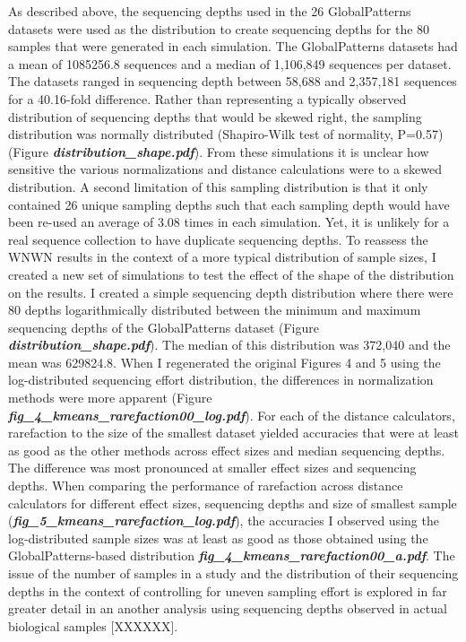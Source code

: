 \documentclass[
]{article}
\begin{document}
As described above, the sequencing depths used in the 26 GlobalPatterns
datasets were used as the distribution to create sequencing depths for
the 80 samples that were generated in each simulation. The
GlobalPatterns datasets had a mean of 1085256.8 sequences and a median
of 1,106,849 sequences per dataset. The datasets ranged in sequencing
depth between 58,688 and 2,357,181 sequences for a 40.16-fold
difference. Rather than representing a typically observed distribution
of sequencing depths that would be skewed right, the sampling
distribution was normally distributed (Shapiro-Wilk test of normality,
P=0.57) (Figure \textbf{\emph{distribution\_shape.pdf}}). From these
simulations it is unclear how sensitive the various normalizations and
distance calculations were to a skewed distribution. A second limitation
of this sampling distribution is that it only contained 26 unique
sampling depths such that each sampling depth would have been re-used an
average of 3.08 times in each simulation. Yet, it is unlikely for a real
sequence collection to have duplicate sequencing depths. To reassess the
WNWN results in the context of a more typical distribution of sample
sizes, I created a new set of simulations to test the effect of the
shape of the distribution on the results. I created a simple sequencing
depth distribution where there were 80 depths logarithmically
distributed between the minimum and maximum sequencing depths of the
GlobalPatterns dataset (Figure \textbf{\emph{distribution\_shape.pdf}}).
The median of this distribution was 372,040 and the mean was 629824.8.
When I regenerated the original Figures 4 and 5 using the
log-distributed sequencing effort distribution, the differences in
normalization methods were more apparent (Figure
\textbf{\emph{fig\_4\_kmeans\_rarefaction00\_log.pdf}}). For each of the
distance calculators, rarefaction to the size of the smallest dataset
yielded accuracies that were at least as good as the other methods
across effect sizes and median sequencing depths. The difference was
most pronounced at smaller effect sizes and sequencing depths. When
comparing the performance of rarefaction across distance calculators for
different effect sizes, sequencing depths and size of smallest sample
(\textbf{\emph{fig\_5\_kmeans\_rarefaction\_log.pdf}}), the accuracies I
observed using the log-distributed sample sizes was at least as good as
those obtained using the GlobalPatterns-based distribution
\textbf{\emph{fig\_4\_kmeans\_rarefaction00\_a.pdf}}. The issue of the
number of samples in a study and the distribution of their sequencing
depths in the context of controlling for uneven sampling effort is
explored in far greater detail in an another analysis using sequencing
depths observed in actual biological samples {[}XXXXXX{]}.
\end{document}
